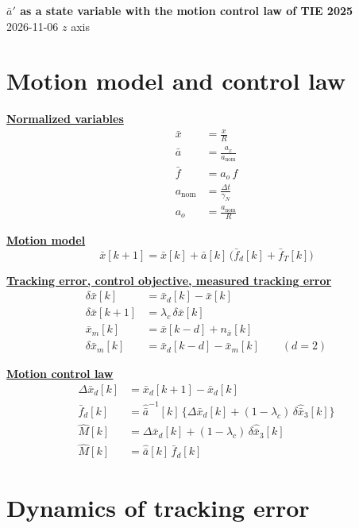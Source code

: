 \documentclass[11pt,a4paper]{ctexart}
\newcommand{\lc}{\lambda_c}
\newcommand{\bx}{\bar{x}}
\newcommand{\ba}{\bar{a}}
\newcommand{\hd}[1]{\par\bigskip\noindent\underline{\textbf{#1}}}
\begin{document}
\begin{center}\textbf{\large $\ba'$ as a state variable with the motion control law of TIE 2025}\\[2pt]
\small 2026-11-06 \quad $z$ axis\end{center}

\section{Motion model and control law}

\hd{Normalized variables}
\[
\begin{aligned}
\bx &= \frac{x}{R} \\
\ba &= \frac{a_x}{a_{\mathrm{nom}}} \\
\bar f &= a_o\, f \\
a_{\mathrm{nom}} &= \frac{\Delta t}{\gamma_N} \\
a_o &= \frac{a_{\mathrm{nom}}}{R}
\end{aligned}
\]

\hd{Motion model}
\[
\bx[k+1] = \bx[k] + \ba[k]\,\big(\bar f_d[k] + \bar f_T[k]\big)
\]

\hd{Tracking error, control objective, measured tracking error}
\[
\begin{aligned}
\delta\bx[k] &= \bx_d[k] - \bx[k] \\
\delta\bx[k+1] &= \lc\,\delta\bx[k] \\
\bx_m[k] &= \bx[k-d] + n_{\bx}[k] \\
\delta\bx_m[k] &= \bx_d[k-d] - \bx_m[k] \qquad (d = 2)
\end{aligned}
\]

\hd{Motion control law}
\[
\begin{aligned}
\Delta\bx_d[k] &= \bx_d[k+1] - \bx_d[k] \\
\bar f_d[k] &= \hat{\ba}^{-1}[k]\,\Big\{\Delta\bx_d[k] + (1-\lc)\,\delta\hat{\bx}_3[k]\Big\} \\
\hat{M}[k] &= \Delta\bx_d[k] + (1-\lc)\,\delta\hat{\bx}_3[k] \\
\hat{M}[k] &= \hat{\ba}[k]\,\bar f_d[k]
\end{aligned}
\]

\section{Dynamics of tracking error}
\end{document}
